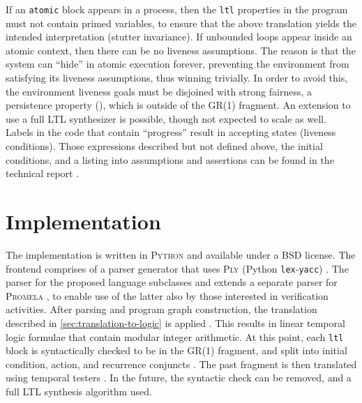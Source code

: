 \documentclass[copyright]{eptcs}
\begin{document}
If an \texttt{atomic} block appears in a process, then the \texttt{ltl} properties in the program must not contain primed variables, to ensure that the above translation yields the intended interpretation (stutter invariance).
If unbounded loops appear inside an atomic context, then there can be no liveness assumptions.
The reason is that the system can “hide” in atomic execution forever, preventing the environment from satisfying its liveness assumptions, thus winning trivially.
In order to avoid this, the environment liveness goals must be disjoined with strong fairness, a persistence property (), which is outside of the GR(1) fragment.
An extension to use a full LTL synthesizer is possible, though not expected to scale as well.
Labels in the code that contain “progress” result in accepting states (liveness conditions).
Those expressions described but not defined above, the initial conditions, and a listing into assumptions and assertions can be found in the technical report \cite{Filippidis15cds3-synt}.
\clearpage{}
\clearpage{}\section{Implementation}
\label{sec:implementation}

The implementation is written in \textsc{Python} and available \cite{Filippidis15github-openpromela,Filippidis15github-promela,Filippidis15github-omega} under a BSD license.
The frontend comprises of a parser generator that uses \textsc{Ply} (Python \texttt{lex}-\texttt{yacc}) \cite{ply34doc}.
The parser for the proposed language subclasses and extends a separate parser for \textsc{Promela} \cite{Filippidis15github-promela}, to enable use of the latter also by those interested in verification activities.
After parsing and program graph construction, the translation described in \cref{sec:translation-to-logic} is applied \cite{Filippidis15github-openpromela}.
This results in linear temporal logic formulae that contain modular integer arithmetic.
At this point, each \texttt{ltl} block is syntactically checked to be in the GR(1) fragment, and split into initial condition, action, and recurrence conjuncts \cite{Filippidis15github-omega}.
The past fragment is then translated using temporal testers \cite{Kesten1998icalp}.
In the future, the syntactic check can be removed, and a full LTL synthesis algorithm used.
\end{document}
